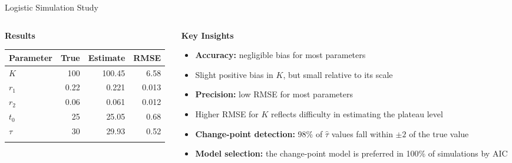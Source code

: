 \documentclass[
  ignorenonframetext,
  aspectratio=169,
]{beamer}
\providecommand{\tightlist}{%
  \setlength{\itemsep}{0pt}\setlength{\parskip}{0pt}}\usepackage{longtable,booktabs,array}
\begin{document}
\begin{frame}{Logistic Simulation Study}
\label{logistic-simulation-study}
\begin{columns}[T]
\begin{column}{0.5\textwidth}
\textbf{Results}

\begin{longtable}[]{@{}lrrr@{}}
\toprule\noalign{}
Parameter & True & Estimate & RMSE \\
\midrule\noalign{}
\endhead
\(K\) & 100 & 100.45 & 6.58 \\
\(r_1\) & 0.22 & 0.221 & 0.013 \\
\(r_2\) & 0.06 & 0.061 & 0.012 \\
\(t_0\) & 25 & 25.05 & 0.68 \\
\(\tau\) & 30 & 29.93 & 0.52 \\
\bottomrule\noalign{}
\end{longtable}
\end{column}

\begin{column}{0.5\textwidth}
\textbf{Key Insights}

\begin{itemize}
\tightlist
\item
  \textbf{Accuracy:} negligible bias for most parameters
\item
  Slight positive bias in \(K\), but small relative to its scale
\item
  \textbf{Precision:} low RMSE for most parameters
\item
  Higher RMSE for \(K\) reflects difficulty in estimating the plateau
  level
\item
  \textbf{Change-point detection:} 98\% of \(\hat\tau\) values fall
  within \(\pm 2\) of the true value
\item
  \textbf{Model selection:} the change-point model is preferred in 100\%
  of simulations by AIC
\end{itemize}
\end{column}
\end{columns}
\end{frame}
\end{document}
